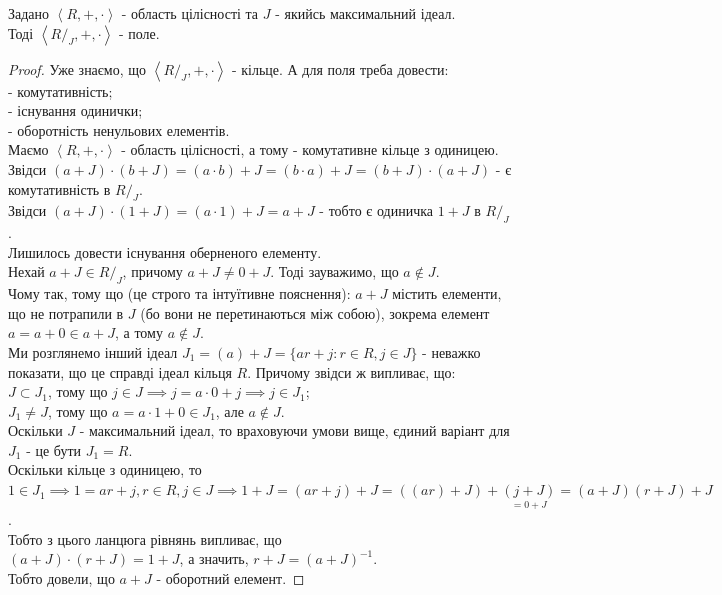 \documentclass{math_library}
\begin{document}
\begin{theorem}
Задано $\left<R,+,\cdot \right>$ - область цілісності та $J$ - якийсь максимальний ідеал.\\
Тоді $\left<R/_J, +, \cdot \right>$ - поле.
\end{theorem}

\begin{proof}
Уже знаємо, що $\left<R/_J, +, \cdot \right>$ - кільце. А для поля треба довести:\\
- комутативність;\\
- існування одинички;\\
- оборотність ненульових елементів.\\
Маємо $\left<R,+,\cdot \right>$ - область цілісності, а тому - комутативне кільце з одиницею.\\
Звідси $(a+J) \cdot (b+J) = (a \cdot b) + J = (b \cdot a) + J = (b+J) \cdot (a+J)$ - є комутативність в $R/_J$.\\
Звідси $(a+J) \cdot (1+J) = (a \cdot 1) + J = a + J$ - тобто є одиничка $1+J$ в $R/_J$.\\
Лишилось довести існування оберненого елементу.\\
Нехай $a+J \in R/_J$, причому $a+J \neq 0+J$. Тоді зауважимо, що $a \not\in J$.\\

Чому так, тому що (це строго та інтуїтивне пояснення): $a+J$ містить елементи, що не потрапили в $J$ (бо вони не перетинаються між собою), зокрема елемент $a = a+0 \in a+J$, а тому $a \not\in J$.
\bigskip \\
Ми розглянемо інший ідеал $J_1 = (a) + J = \{ar+j: r \in R, j \in J\}$ - неважко показати, що це справді ідеал кільця $R$. Причому звідси ж випливає, що: \\
$J \subset J_1$, тому що $j \in J \implies j = a \cdot 0 + j \implies j \in J_1$;\\
$J_1 \neq J$, тому що $a = a \cdot 1 + 0 \in J_1$, але $a \not\in J$.\\
Оскільки $J$ - максимальний ідеал, то враховуючи умови вище, єдиний варіант для $J_1$ - це бути $J_1 = R$.\\
Оскільки кільце з одиницею, то $1 \in J_1 \implies 1 = ar+j, r \in R, j \in J \implies 1+J = (ar+j) + J = ((ar)+J) + \underset{= 0+J}{(j+J)} = (a+J)(r+J) +J$.\\
Тобто з цього ланцюга рівнянь випливає, що\\
$(a+J) \cdot (r+J) = 1+J$, а значить, $r+J = (a+J)^{-1}$.\\
Тобто довели, що $a+J$ - оборотний елемент.
\end{proof}
\fi
\end{document}

